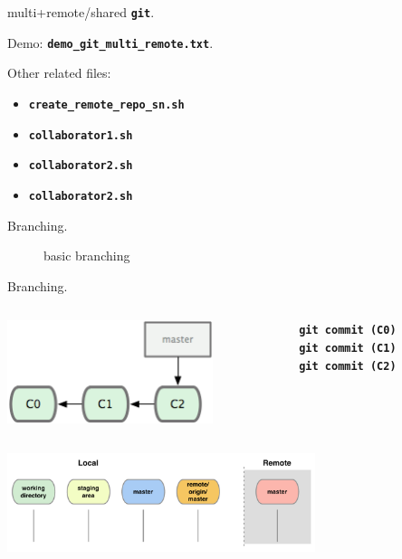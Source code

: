\documentclass{beamer}
\newcommand{\git}{\texttt{\textbf{git}}\xspace}
\begin{document}
\begin{frame}{multi+remote/shared \git.}
  \begin{center}
    Demo: \texttt{\textbf{demo\_git\_multi\_remote.txt}}.
  \end{center}
  Other related files:
  \begin{itemize}
  \item \texttt{\textbf{create\_remote\_repo\_sn.sh}}
  \item \texttt{\textbf{collaborator1.sh}}
  \item \texttt{\textbf{collaborator2.sh}}
  \item \texttt{\textbf{collaborator2.sh}}
  \end{itemize}
\end{frame}


\begin{frame}{Branching.}
  \begin{figure}
    \centering
    basic branching
  \end{figure}
\end{frame}

\begin{frame}{Branching.}
  \begin{columns}
    \begin{column}{0.6\linewidth}
      \begin{center}
        \includegraphics[width=6cm]{figs/18333fig0310-tn}
      \end{center}
    \end{column}
    \begin{column}{0.4\linewidth}
      \begin{center}
        \texttt{\textbf{git commit (C0)}}\\
        \texttt{\textbf{git commit (C1)}}\\
        \texttt{\textbf{git commit (C2)}}
      \end{center}
    \end{column}
  \end{columns}
  \vspace{1em}
  \begin{center}
    \includegraphics[width=9cm]{figs/local-remote-clone}
  \end{center}
\end{frame}
\end{document}
